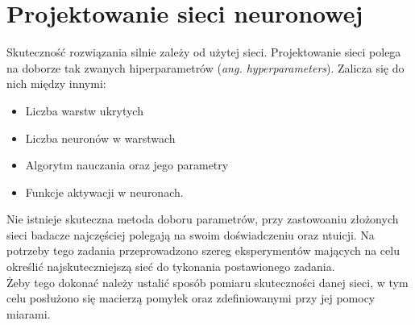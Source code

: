 \documentclass[12pt, a4paper, oneside]{article}
\begin{document}
	
	
	
	
	\cite{Wylomanska01}
	
	
	
	\section{Projektowanie sieci neuronowej}
	Skuteczność rozwiązania silnie zależy od użytej sieci. Projektowanie sieci polega na doborze tak zwanych hiperparametrów (\textit{ang. hyperparameters}). Zalicza się do nich między innymi:
	\begin{itemize}
		\item Liczba warstw ukrytych
		\item Liczba neuronów w warstwach
		\item Algorytm nauczania oraz jego parametry
		\item Funkcje aktywacji w neuronach.
	\end{itemize}

	Nie istnieje skuteczna metoda doboru parametrów, przy zastowoaniu złożonych sieci badacze najczęściej polegają na swoim doświadczeniu oraz ntuicji. Na potrzeby tego zadania przeprowadzono szereg eksperymentów mających na celu określić najskuteczniejszą sieć do tykonania postawionego zadania. \\
	
	Żeby tego dokonać należy ustalić sposób pomiaru skuteczności danej sieci, w tym celu posłużono się macierzą pomyłek oraz zdefiniowanymi przy jej pomocy miarami.
\end{document}
